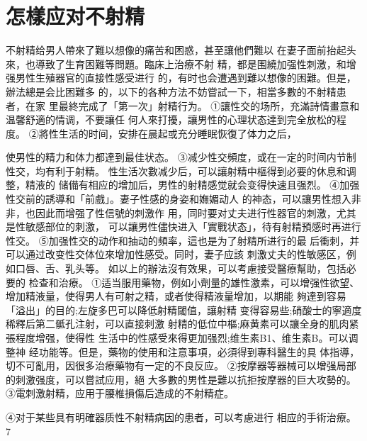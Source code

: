 \documentclass[12pt,UTF8]{ctexbook}
\begin{document}
\section{怎樣应对不射精}
不射精给男人帶來了難以想像的痛苦和困惑，甚至讓他們難以
在妻子面前抬起头來，也導致了生育困難等問題。臨床上治療不射
精，都是围繞加强性刺激，和增强男性生殖器官的直接性感受进行
的，有时也会遭遇到難以想像的困難。但是，辦法總是会比困難多
的，以下的各种方法不妨嘗試一下，相當多數的不射精患者，在家
里最終完成了「第一次」射精行为。
①讓性交的场所，充滿詩情畫意和温馨舒適的情调，不要讓任
何人來打擾，讓男性的心理状态達到完全放松的程度。
②將性生活的时间，安排在晨起或充分睡眠恢復了体力之后，

使男性的精力和体力都達到最佳状态。
③减少性交頻度，或在一定的时间内节制性交，均有利于射精。
性生活次數减少后，可以讓射精中樞得到必要的休息和调整，精液的
储備有相应的增加后，男性的射精感觉就会变得快速且强烈。
④加强性交前的誘導和「前戲」。妻子性感的身姿和嫵媚动人
的神态，可以讓男性想入非非，也因此而增强了性信號的刺激作
用，同时要对丈夫进行性器官的刺激，尤其是性敏感部位的刺激，
可以讓男性儘快进入「實戰状态」，待有射精預感时再进行性交。
⑤加强性交的动作和抽动的頻率，這也是为了射精所进行的最
后衝刺，并可以通过改变性交体位來增加性感受。同时，妻子应該
刺激丈夫的性敏感区，例如口唇、舌、乳头等。
如以上的辦法沒有效果，可以考慮接受醫療幫助，包括必要的
检查和治療。
①适当服用藥物，例如小劑量的雄性激素，可以增强性欲望、
增加精液量，使得男人有可射之精，或者使得精液量增加，以期能
夠達到容易「溢出」的目的;左旋多巴可以降低射精閾值，讓射精
变得容易些;硝酸士的寧適度稀釋后第二骶孔注射，可以直接刺激
射精的低位中樞;麻黄素可以讓全身的肌肉紧張程度增强，使得性
生活中的性感受來得更加强烈;维生素B1、维生素B。可以调整神
经功能等。但是，藥物的使用和注意事項，必須得到專科醫生的具
体指導，切不可亂用，因很多治療藥物有一定的不良反应。
②按摩器等器械可以增强局部的刺激强度，可以嘗試应用，絕
大多數的男性是難以抗拒按摩器的巨大攻勢的。
③電刺激射精，应用于腰椎損傷后造成的不射精症。

④对于某些具有明確器质性不射精病因的患者，可以考慮进行
相应的手術治療。
7
\end{document}
